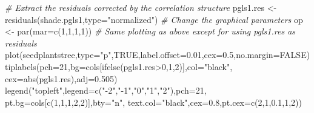 \documentclass[
]{book}
\newenvironment{Shaded}{\begin{snugshade}}{\end{snugshade}}
\newcommand{\AttributeTok}[1]{\textcolor[rgb]{0.77,0.63,0.00}{#1}}
\newcommand{\CommentTok}[1]{\textcolor[rgb]{0.56,0.35,0.01}{\textit{#1}}}
\newcommand{\ConstantTok}[1]{\textcolor[rgb]{0.00,0.00,0.00}{#1}}
\newcommand{\DecValTok}[1]{\textcolor[rgb]{0.00,0.00,0.81}{#1}}
\newcommand{\FloatTok}[1]{\textcolor[rgb]{0.00,0.00,0.81}{#1}}
\newcommand{\FunctionTok}[1]{\textcolor[rgb]{0.00,0.00,0.00}{#1}}
\newcommand{\NormalTok}[1]{#1}
\newcommand{\OtherTok}[1]{\textcolor[rgb]{0.56,0.35,0.01}{#1}}
\newcommand{\SpecialCharTok}[1]{\textcolor[rgb]{0.00,0.00,0.00}{#1}}
\newcommand{\StringTok}[1]{\textcolor[rgb]{0.31,0.60,0.02}{#1}}
\begin{document}
\begin{Shaded}
\begin{Highlighting}[]
\CommentTok{\# Extract the residuals corrected by the correlation structure}
\NormalTok{pgls1.res }\OtherTok{\textless{}{-}} \FunctionTok{residuals}\NormalTok{(shade.pgls1,}\AttributeTok{type=}\StringTok{"normalized"}\NormalTok{)}
\CommentTok{\# Change the graphical parameters}
\NormalTok{op }\OtherTok{\textless{}{-}} \FunctionTok{par}\NormalTok{(}\AttributeTok{mar=}\FunctionTok{c}\NormalTok{(}\DecValTok{1}\NormalTok{,}\DecValTok{1}\NormalTok{,}\DecValTok{1}\NormalTok{,}\DecValTok{1}\NormalTok{))}
\CommentTok{\# Same plotting as above except for using pgls1.res as residuals}
\FunctionTok{plot}\NormalTok{(seedplantstree,}\AttributeTok{type=}\StringTok{"p"}\NormalTok{,}\ConstantTok{TRUE}\NormalTok{,}\AttributeTok{label.offset=}\FloatTok{0.01}\NormalTok{,}\AttributeTok{cex=}\FloatTok{0.5}\NormalTok{,}\AttributeTok{no.margin=}\ConstantTok{FALSE}\NormalTok{)}
\FunctionTok{tiplabels}\NormalTok{(}\AttributeTok{pch=}\DecValTok{21}\NormalTok{,}\AttributeTok{bg=}\NormalTok{cols[}\FunctionTok{ifelse}\NormalTok{(pgls1.res}\SpecialCharTok{\textgreater{}}\DecValTok{0}\NormalTok{,}\DecValTok{1}\NormalTok{,}\DecValTok{2}\NormalTok{)],}\AttributeTok{col=}\StringTok{"black"}\NormalTok{,}
          \AttributeTok{cex=}\FunctionTok{abs}\NormalTok{(pgls1.res),}\AttributeTok{adj=}\FloatTok{0.505}\NormalTok{)}
\FunctionTok{legend}\NormalTok{(}\StringTok{"topleft"}\NormalTok{,}\AttributeTok{legend=}\FunctionTok{c}\NormalTok{(}\StringTok{"{-}2"}\NormalTok{,}\StringTok{"{-}1"}\NormalTok{,}\StringTok{"0"}\NormalTok{,}\StringTok{"1"}\NormalTok{,}\StringTok{"2"}\NormalTok{),}\AttributeTok{pch=}\DecValTok{21}\NormalTok{,}
       \AttributeTok{pt.bg=}\NormalTok{cols[}\FunctionTok{c}\NormalTok{(}\DecValTok{1}\NormalTok{,}\DecValTok{1}\NormalTok{,}\DecValTok{1}\NormalTok{,}\DecValTok{2}\NormalTok{,}\DecValTok{2}\NormalTok{)],}\AttributeTok{bty=}\StringTok{"n"}\NormalTok{,}
       \AttributeTok{text.col=}\StringTok{"black"}\NormalTok{,}\AttributeTok{cex=}\FloatTok{0.8}\NormalTok{,}\AttributeTok{pt.cex=}\FunctionTok{c}\NormalTok{(}\DecValTok{2}\NormalTok{,}\DecValTok{1}\NormalTok{,}\FloatTok{0.1}\NormalTok{,}\DecValTok{1}\NormalTok{,}\DecValTok{2}\NormalTok{))}
\end{Highlighting}
\end{Shaded}
\end{document}
